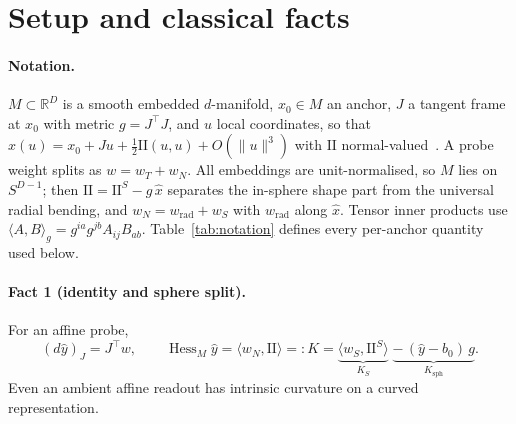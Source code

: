 \documentclass[10pt]{article}
\newcommand{\norm}[1]{\lVert #1 \rVert}
\newcommand{\II}{\mathrm{II}}
\newcommand{\Hess}{\operatorname{Hess}_M}
\begin{document}
\section{Setup and classical facts}
\label{sec:setup}

\paragraph{Notation.} $M\subset\mathbb{R}^D$ is a smooth embedded $d$-manifold, $x_0\in M$ an anchor, $J$ a tangent frame at $x_0$ with metric $g=J^\top J$, and $u$ local coordinates, so that $x(u)=x_0+Ju+\tfrac12\II(u,u)+O(\norm{u}^3)$ with $\II$ normal-valued~\citep{lee2018riemannian}. A probe weight splits as $w=w_T+w_N$. All embeddings are unit-normalised, so $M$ lies on $S^{D-1}$; then $\II=\II^S-g\,\hat x$ separates the in-sphere shape part from the universal radial bending, and $w_N=w_{\mathrm{rad}}+w_S$ with $w_{\mathrm{rad}}$ along $\hat x$. Tensor inner products use $\langle A,B\rangle_g=g^{ia}g^{jb}A_{ij}B_{ab}$. Table~\ref{tab:notation} defines every per-anchor quantity used below.

\paragraph{Fact 1 (identity and sphere split).} For an affine probe,
\begin{equation}
(d\hat y)_J=J^\top w,\qquad \Hess\hat y=\langle w_N,\II\rangle=:K=\underbrace{\langle w_S,\II^S\rangle}_{K_S}\;\underbrace{-\,(\hat y-b_0)\,g}_{K_{\mathrm{sph}}}.
\label{eq:hess}
\end{equation}
Even an ambient affine readout has intrinsic curvature on a curved representation.
\end{document}
